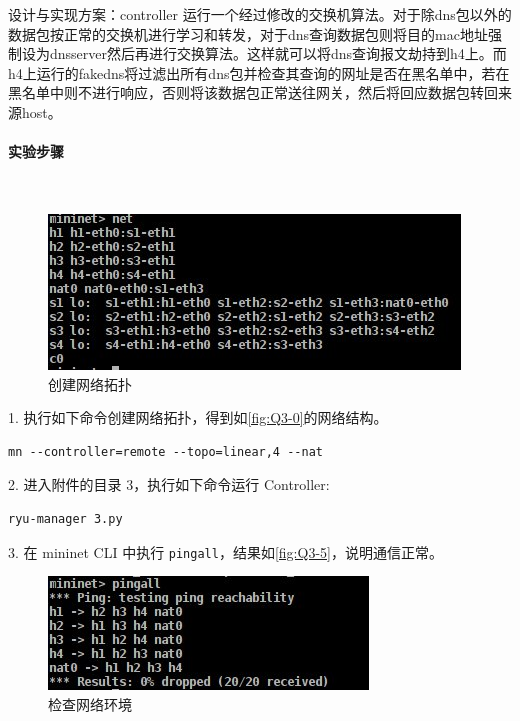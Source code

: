 \documentclass[format=draft,language=chinese,category=SDN]{hustreport}
\newcommand{\myparagraph}[1]{\paragraph{#1}\mbox{}\\}
\newcommand{\code}{\texttt}
\begin{document}
设计与实现方案：controller 运行一个经过修改的交换机算法。对于除dns包以外的数据包按正常的交换机进行学习和转发，对于dns查询数据包则将目的mac地址强制设为dnsserver然后再进行交换算法。这样就可以将dns查询报文劫持到h4上。而h4上运行的fakedns将过滤出所有dns包并检查其查询的网址是否在黑名单中，若在黑名单中则不进行响应，否则将该数据包正常送往网关，然后将回应数据包转回来源host。

\myparagraph{实验步骤}
\begin{figure}[!h]
\centering
\includegraphics[width=.5\textwidth]{fig/3_0}
\caption{创建网络拓扑}\label{fig:Q3-0}
\end{figure}

1. 执行如下命令创建网络拓扑，得到如\autoref{fig:Q3-0}的网络结构。
\begin{lstlisting}
mn --controller=remote --topo=linear,4 --nat
\end{lstlisting}

2. 进入附件的目录 3，执行如下命令运行 Controller:
\begin{lstlisting}
ryu-manager 3.py
\end{lstlisting}

3. 在 mininet CLI 中执行 \code{pingall}，结果如\autoref{fig:Q3-5}，说明通信正常。

\begin{figure}[!h]
\centering
\includegraphics[width=.5\textwidth]{fig/3_5}
\caption{检查网络环境}\label{fig:Q3-5}
\end{figure}
\end{document}
